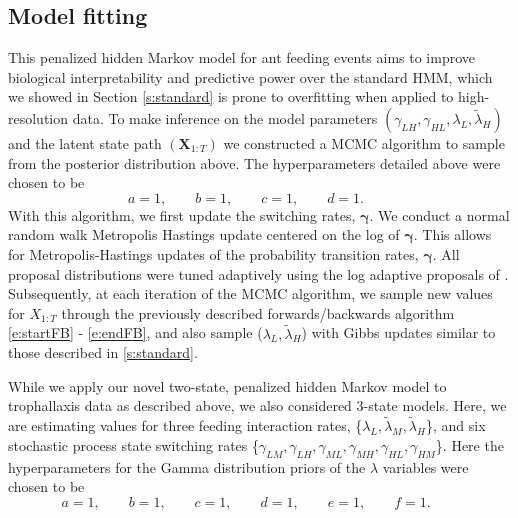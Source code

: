 \documentclass[cmbright,fleqn,referee]{envauth}
\begin{document}
\subsection{Model fitting}
% 
This penalized hidden Markov model for ant feeding events aims to improve biological interpretability and predictive power over the standard HMM, which we showed in Section \ref{s:standard} is prone to overfitting when applied to high-resolution data. To make inference on the model parameters $(\gamma_{LH}, \gamma_{HL}, \lambda_L, \tilde{\lambda}_H)$ and the latent state path $(\mathbf{X}_{1:T})$ we constructed a MCMC algorithm to sample from the posterior distribution above. The hyperparameters detailed above were chosen to be 
\begin{equation}
a = 1, \qquad
b = 1, \qquad
c = 1, \qquad
d = 1. \qquad
\end{equation}
With this algorithm, we first update the switching rates, $\bm{\gamma}$. We conduct a normal random walk Metropolis Hastings update centered on the log of $\bm{\gamma}$. This allows for Metropolis-Hastings updates of the probability transition rates, $\bm{\gamma}$. All proposal distributions were tuned adaptively using the log adaptive proposals of \cite{Shaby2010}. Subsequently, at each iteration of the MCMC algorithm, we sample new values for $X_{1:T}$ through the previously described forwards/backwards algorithm \eqref{e:startFB} - \eqref{e:endFB}, and also sample ($\lambda_L, \tilde{\lambda}_H$) with Gibbs updates similar to those described in \ref{s:standard}. 

While we apply our novel two-state, penalized hidden Markov model to trophallaxis data as described above,  we also considered 3-state models. Here, we are estimating values for three feeding interaction rates, \{$\lambda_L, \tilde{\lambda}_M, \tilde{\lambda}_H$\}, and six stochastic process state switching rates \{$\gamma_{LM}, \gamma_{LH}, \gamma_{ML}, \gamma_{MH}, \gamma_{HL}, \gamma_{HM}$\}. Here the hyperparameters for the Gamma distribution priors of the $\lambda$ variables were chosen to be 
\begin{equation}
a = 1, \qquad
b = 1, \qquad
c = 1, \qquad
d = 1, \qquad
e = 1, \qquad
f = 1. \qquad
\end{equation}
% 
\end{document}
